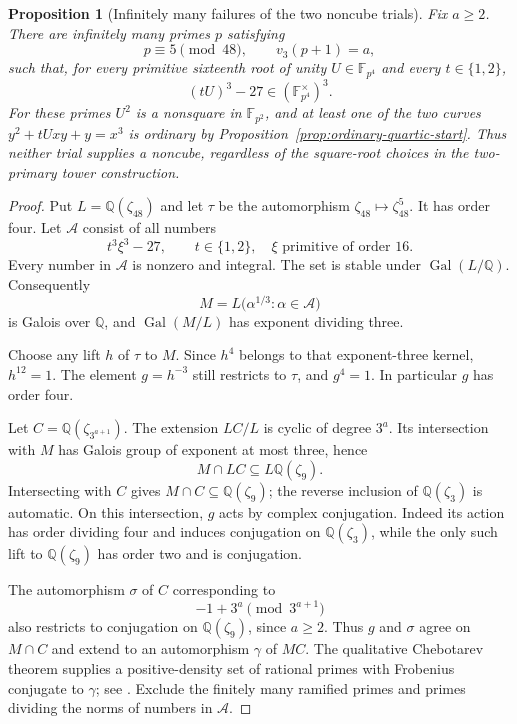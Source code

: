 \documentclass[11pt]{article}
\newtheorem{proposition}[theorem]{Proposition}
\theoremstyle{definition}
\theoremstyle{remark}
\begin{document}
\begin{proposition}[Infinitely many failures of the two noncube trials]
\label{prop:quartic-finite-trial-failure}
Fix $a\ge2$.  There are infinitely many primes $p$ satisfying
\[
 p\equiv5\pmod{48},\qquad v_3(p+1)=a,
\]
such that, for every primitive sixteenth root of unity
$U\in\mathbb F_{p^4}$ and every $t\in\{1,2\}$,
\[
 (tU)^3-27\in(\mathbb F_{p^4}^{\times})^3.
\]
For these primes $U^2$ is a nonsquare in $\mathbb F_{p^2}$,
and at least one of the two curves
$y^2+tUxy+y=x^3$ is ordinary by
Proposition~\ref{prop:ordinary-quartic-start}.  Thus neither
trial supplies a noncube, regardless of the square-root choices
in the two-primary tower construction.
\end{proposition}

\begin{proof}
Put $L=\mathbb Q(\zeta_{48})$ and let $\tau$ be the
automorphism $\zeta_{48}\mapsto\zeta_{48}^{5}$.
It has order four.  Let $\mathcal A$ consist of all numbers
\[
 t^3\xi^3-27,
 \qquad t\in\{1,2\},\quad \xi\text{ primitive of order }16.
\]
Every number in $\mathcal A$ is nonzero and integral.
The set is stable under $\operatorname{Gal}(L/\mathbb Q)$.
Consequently
\[
 M=L\bigl(\alpha^{1/3}:\alpha\in\mathcal A\bigr)
\]
is Galois over $\mathbb Q$, and
$\operatorname{Gal}(M/L)$ has exponent dividing three.

Choose any lift $h$ of $\tau$ to $M$.  Since $h^4$ belongs
to that exponent-three kernel, $h^{12}=1$.  The element
$g=h^{-3}$ still restricts to $\tau$, and $g^4=1$.
In particular $g$ has order four.

Let $C=\mathbb Q(\zeta_{3^{a+1}})$.  The extension
$LC/L$ is cyclic of degree $3^a$.  Its intersection with
$M$ has Galois group of exponent at most three, hence
\[
 M\cap LC\subseteq L\mathbb Q(\zeta_9).
\]
Intersecting with $C$ gives
$M\cap C\subseteq\mathbb Q(\zeta_9)$; the reverse
inclusion of $\mathbb Q(\zeta_3)$ is automatic.
On this intersection, $g$ acts by complex conjugation.
Indeed its action has order dividing four and induces
conjugation on $\mathbb Q(\zeta_3)$, while the only
such lift to $\mathbb Q(\zeta_9)$ has order two and
is conjugation.

The automorphism $\sigma$ of $C$ corresponding to
\[
 -1+3^a\pmod{3^{a+1}}
\]
also restricts to conjugation on $\mathbb Q(\zeta_9)$,
since $a\ge2$.  Thus $g$ and $\sigma$ agree on $M\cap C$
and extend to an automorphism $\gamma$ of $MC$.
The qualitative Chebotarev theorem supplies a positive-density
set of rational primes with Frobenius conjugate to $\gamma$;
see \cite[Section~2.1, Theorem~1, p.~131]{Serre1981Chebotarev}.
Exclude the finitely many ramified primes and primes dividing
the norms of numbers in $\mathcal A$.


\end{proof}
\end{document}
